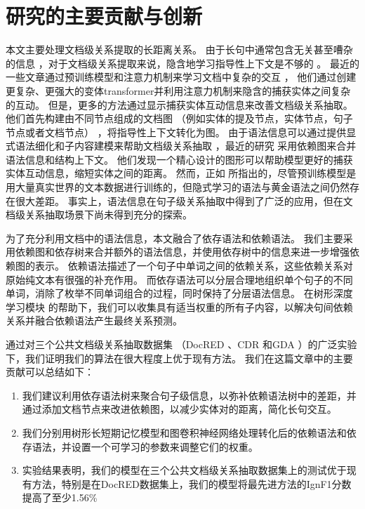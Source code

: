 \documentclass[bachelor]{thesis-uestc}
\begin{document}
\section{研究的主要贡献与创新}
本文主要处理文档级关系提取的长距离关系。
由于长句中通常包含无关甚至嘈杂的信息 \cite{gupta2019neural}，对于文档级关系提取来说，隐含地学习指导性上下文是不够的 \cite{bai-etal-2021-syntax}。
最近的一些文章通过预训练模型和注意力机制来学习文档中复杂的交互 \cite{huang-etal-2021-three, y2020-coreferential, zhou2021document}， 他们通过创建更复杂、更强大的变体transformer并利用注意力机制来隐含的捕获实体之间复杂的互动。
但是，更多的方法通过显示捕获实体互动信息来改善文档级关系抽取。他们首先构建由不同节点组成的文档图 （例如实体的提及节点，实体节点，句子节点或者文档节点） \cite{GAIN, liu2023document}，将指导性上下文转化为图。
由于语法信息可以通过提供显式语法细化和子内容建模来帮助文档级关系抽取 \cite{duan-etal-2022-just}，最近的研究 \cite{sahu2019inter, SagDRE} 采用依赖图来合并语法信息和结构上下文。
他们发现一个精心设计的图形可以帮助模型更好的捕获实体互动信息，缩短实体之间的距离。
然而，正如 \cite{bai-etal-2021-syntax}所指出的，尽管预训练模型是用大量真实世界的文本数据进行训练的，但隐式学习的语法与黄金语法之间仍然存在很大差距。
事实上，语法信息在句子级关系抽取中得到了广泛的应用\cite{xu-etal-2016-improved, qin-etal-2021-relation}，但在文档级关系抽取场景下尚未得到充分的探索。\par

为了充分利用文档中的语法信息，本文融合了依存语法和依赖语法。
我们主要采用依赖图和依存树来合并额外的语法信息，并使用依存树中的信息来进一步增强依赖图的表示。
依赖语法描述了一个句子中单词之间的依赖关系，这些依赖关系对原始纯文本有很强的补充作用。
而依存语法可以分层合理地组织单个句子的不同单词，消除了枚举不同单词组合的过程，同时保持了分层语法信息。
在树形深度学习模块 \cite{duan-etal-2022-just} 的帮助下，我们可以收集具有适当权重的所有子内容，以解决句间依赖关系并融合依赖语法产生最终关系预测。\par


通过对三个公共文档级关系抽取数据集 （DocRED \cite{DOCRED}、CDR \cite{li2016biocreative} 和GDA \cite{GDA} ）的广泛实验下，我们证明我们的算法在很大程度上优于现有方法。
我们在这篇文章中的主要贡献可以总结如下：
\begin{enumerate}
    \item 我们建议利用依存语法树来聚合句子级信息，以弥补依赖语法树中的差距，并通过添加文档节点来改进依赖图，以减少实体对的距离，简化长句交互。
    \item 我们分别用树形长短期记忆模型和图卷积神经网络处理转化后的依赖语法和依存语法，并设置一个可学习的参数来调整它们的权重。
    \item 实验结果表明，我们的模型在三个公共文档级关系抽取数据集上的测试优于现有方法，特别是在DocRED数据集上，我们的模型将最先进方法的IgnF1分数提高了至少1.56\%
\end{enumerate}
\end{document}
